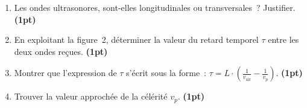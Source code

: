 \vspace{-2cm}
\begin{minipage}{0.63\linewidth}
    \begin{enumerate}
    \item Les ondes ultrasonores, sont-elles longitudinales ou
          transversales~? Justifier.
          \textbf{(1pt)}
    \item En exploitant la figure~2, déterminer la valeur du retard temporel
          $\tau$ entre les deux ondes reçues.
          \textbf{(1pt)}
\end{enumerate}
\end{minipage}

\begin{enumerate}
    \setcounter{enumi}{2}
    \item Montrer que l'expression de $\tau$ s'écrit sous la forme~:
          $\tau=L \cdot\left(\frac{1}{v_{\text{air}}}-\frac{1}{v_p}\right)$.
          \textbf{(1pt)}
    \item Trouver la valeur approchée de la célérité $v_p$.
          \textbf{(1pt)}
\end{enumerate}
